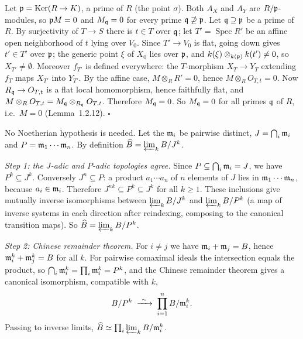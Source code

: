 \documentclass[11pt]{article}
\begin{document}
Let $\mathfrak p=\operatorname{Ker}(R\to K)$, a prime of $R$ (the point $\sigma$). Both $A_X$ and $A_Y$ are $R/\mathfrak p$-modules, so $\mathfrak p M=0$ and $M_\mathfrak q=0$ for every prime $\mathfrak q\not\supseteq\mathfrak p$. Let $\mathfrak q\supseteq\mathfrak p$ be a prime of $R$. By surjectivity of $T\to S$ there is $t\in T$ over $\mathfrak q$; let $T'=\operatorname{Spec}R'$ be an affine open neighborhood of $t$ lying over $V_0$. Since $T'\to V_0$ is flat, going down gives $t'\in T'$ over $\mathfrak p$; the generic point $\xi$ of $X_0$ lies over $\mathfrak p$, and $k(\xi)\otimes_{k(\mathfrak p)}k(t')\neq0$, so $X_{T'}\neq\emptyset$. Moreover $f_{T'}$ is defined everywhere: the $T$-morphism $X_T\to Y_T$ extending $f_T$ maps $X_{T'}$ into $Y_{T'}$. By the affine case, $M\otimes_RR'=0$, hence $M\otimes_RO_{T,t}=0$. Now $R_\mathfrak q\to O_{T,t}$ is a flat local homomorphism, hence faithfully flat, and $M\otimes_RO_{T,t}=M_\mathfrak q\otimes_{R_\mathfrak q}O_{T,t}$. Therefore $M_\mathfrak q=0$. So $M_\mathfrak q=0$ for all primes $\mathfrak q$ of $R$, i.e.\ $M=0$ (Lemma~1.2.12). \hfill$\square$

\pf
No Noetherian hypothesis is needed. Let the $\mathfrak m_i$ be pairwise distinct, $J=\bigcap_i\mathfrak m_i$ and $P=\mathfrak m_1\cdots\mathfrak m_n$. By definition $\widehat B=\varprojlim_kB/J^k$.

\emph{Step 1: the $J$-adic and $P$-adic topologies agree.} Since $P\subseteq\bigcap_i\mathfrak m_i=J$, we have $P^k\subseteq J^k$. Conversely $J^n\subseteq P$: a product $a_1\cdots a_n$ of $n$ elements of $J$ lies in $\mathfrak m_1\cdots\mathfrak m_n$, because $a_i\in\mathfrak m_i$. Therefore $J^{nk}\subseteq P^k\subseteq J^k$ for all $k\ge1$. These inclusions give mutually inverse isomorphisms between $\varprojlim_kB/J^k$ and $\varprojlim_kB/P^k$ (a map of inverse systems in each direction after reindexing, composing to the canonical transition maps). So $\widehat B=\varprojlim_kB/P^k$.

\emph{Step 2: Chinese remainder theorem.} For $i\ne j$ we have $\mathfrak m_i+\mathfrak m_j=B$, hence $\mathfrak m_i^k+\mathfrak m_j^k=B$ for all $k$. For pairwise comaximal ideals the intersection equals the product, so $\bigcap_i\mathfrak m_i^k=\prod_i\mathfrak m_i^k=P^k$, and the Chinese remainder theorem gives a canonical isomorphism, compatible with $k$,
\[ B/P^k\;\xrightarrow{\ \sim\ }\;\prod_{i=1}^nB/\fm_i^k. \]
Passing to inverse limits, $\widehat B\simeq\prod_i\varprojlim_kB/\mathfrak m_i^k$.
\end{document}
